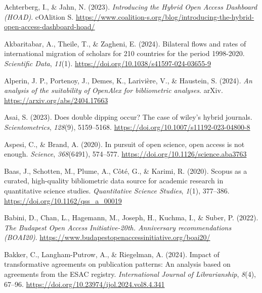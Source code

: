 \documentclass[a4paper,man,floatsintext,longtable,noextraspace,10pt]{apa6}
\newlength{\cslhangindent}
\newenvironment{CSLReferences}[2] %
{\begin{list}{}{%
  \setlength{\itemindent}{0pt}
  \setlength{\leftmargin}{0pt}
  \setlength{\parsep}{0pt}
  \ifodd #1
  \setlength{\leftmargin}{\cslhangindent}
  \setlength{\itemindent}{-1\cslhangindent}
  \fi
  \setlength{\itemsep}{#2\baselineskip}}}
{\end{list}}
\begin{document}
\label{refs}
\begin{CSLReferences}{1}{0}
Achterberg, I., \& Jahn, N. (2023). \emph{Introducing the {Hybrid Open
Access Dashboard (HOAD)}}. {cOAlition S}.
\url{https://www.coalition-s.org/blog/introducing-the-hybrid-open-access-dashboard-hoad/}

Akbaritabar, A., Theile, T., \& Zagheni, E. (2024). Bilateral flows and
rates of international migration of scholars for 210 countries for the
period 1998-2020. \emph{Scientific Data}, \emph{11}(1).
\url{https://doi.org/10.1038/s41597-024-03655-9}

Alperin, J. P., Portenoy, J., Demes, K., Larivière, V., \& Haustein, S.
(2024). \emph{An analysis of the suitability of OpenAlex for
bibliometric analyses}. arXiv. \url{https://arxiv.org/abs/2404.17663}

Asai, S. (2023). Does double dipping occur? The case of wiley's hybrid
journals. \emph{Scientometrics}, \emph{128}(9), 5159--5168.
\url{https://doi.org/10.1007/s11192-023-04800-8}

Aspesi, C., \& Brand, A. (2020). In pursuit of open science, open access
is not enough. \emph{Science}, \emph{368}(6491), 574--577.
\url{https://doi.org/10.1126/science.aba3763}

Baas, J., Schotten, M., Plume, A., Côté, G., \& Karimi, R. (2020).
Scopus as a curated, high-quality bibliometric data source for academic
research in quantitative science studies. \emph{Quantitative Science
Studies}, \emph{1}(1), 377--386.
\url{https://doi.org/10.1162/qss_a_00019}

Babini, D., Chan, L., Hagemann, M., Joseph, H., Kuchma, I., \& Suber, P.
(2022). \emph{{The Budapest Open Access Initiative-20th. Anniversary
recommendations (BOAI20)}}.
\url{https://www.budapestopenaccessinitiative.org/boai20/}

Bakker, C., Langham-Putrow, A., \& Riegelman, A. (2024). Impact of
transformative agreements on publication patterns: An analysis based on
agreements from the ESAC registry. \emph{International Journal of
Librarianship}, \emph{8}(4), 67--96.
\url{https://doi.org/10.23974/ijol.2024.vol8.4.341}


\end{CSLReferences}
\end{document}
